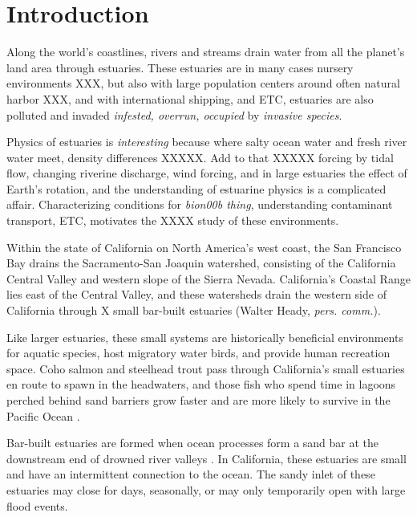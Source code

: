 \chapter{Introduction}
\label{chIntro}

Along the world's coastlines, rivers and streams drain water from all the planet's land area through estuaries.  These estuaries are in many cases nursery environments XXX, but also with large population centers around often natural harbor XXX, and with international shipping, and ETC, estuaries are also polluted and invaded \emph{infested, overrun, occupied} by \emph{invasive species}. 

Physics of estuaries is \emph{interesting} because where salty ocean water and fresh river water meet, density differences XXXXX. Add to that XXXXX forcing by tidal flow, changing riverine discharge, wind forcing, and in large estuaries the effect of Earth's rotation, and the understanding of estuarine physics is a complicated affair. Characterizing conditions for \emph{bion00b thing}, understanding contaminant transport, ETC, motivates the XXXX study of these environments. 

Within the state of California on North America's west coast, the San Francisco Bay drains the Sacramento-San Joaquin watershed, consisting of the California Central Valley and western slope of the Sierra Nevada. California's Coastal Range lies east of the Central Valley, and these watersheds drain the western side of California through X small bar-built estuaries (Walter Heady, \emph{pers. comm.}).

Like larger estuaries, these small systems are historically beneficial environments for aquatic species, host migratory water birds, and provide human recreation space. Coho salmon and steelhead trout pass through California's small estuaries en route to spawn in the headwaters, and those fish who spend time in lagoons perched behind sand barriers grow faster and are more likely to survive in the Pacific Ocean \parencite{hayes_steelhead_2008, bond_marine_2008}. 

Bar-built estuaries are formed when ocean processes form a sand bar at the downstream end of drowned river valleys \parencite{nielsen_coastal_2009}. In California, these estuaries are small and have an intermittent connection to the ocean. The sandy inlet of these estuaries may close for days, seasonally, or may only temporarily open with large flood events. 

